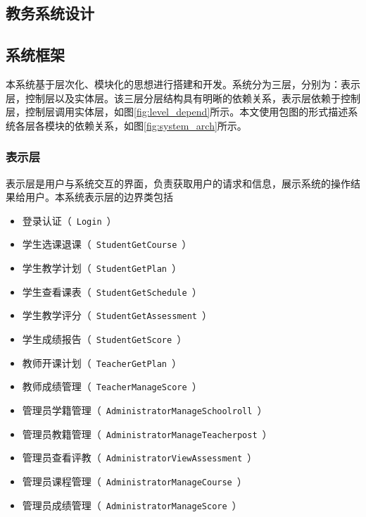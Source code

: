 \begin{center}
  \section{教务系统设计}
\end{center}

\subsection{系统框架}\label{sec:system_frame}
本系统基于层次化、模块化的思想进行搭建和开发。系统分为三层，分别为：表示层，控制层以及实体层。该三层分层结构具有明晰的依赖关系，表示层依赖于控制层，控制层调用实体层，如图\ref{fig:level_depend}所示。本文使用包图的形式描述系统各层各模块的依赖关系，如图\ref{fig:system_arch}所示。

\subsubsection{表示层}
  
表示层是用户与系统交互的界面，负责获取用户的请求和信息，展示系统的操作结果给用户。本系统表示层的边界类包括

\begin{itemize}
  \item 登录认证（~\texttt{Login}~）
  \item 学生选课退课（~\texttt{StudentGetCourse}~）
  \item 学生教学计划（~\texttt{StudentGetPlan}~）
  \item 学生查看课表（~\texttt{StudentGetSchedule}~）
  \item 学生教学评分（~\texttt{StudentGetAssessment}~）
  \item 学生成绩报告（~\texttt{StudentGetScore}~）
  \item 教师开课计划（~\texttt{TeacherGetPlan}~）
  \item 教师成绩管理（~\texttt{TeacherManageScore}~）
  \item 管理员学籍管理（~\texttt{AdministratorManageSchoolroll}~）
  \item 管理员教籍管理（~\texttt{AdministratorManageTeacherpost}~）
  \item 管理员查看评教（~\texttt{AdministratorViewAssessment}~）
  \item 管理员课程管理（~\texttt{AdministratorManageCourse}~）
  \item 管理员成绩管理（~\texttt{AdministratorManageScore}~）
\end{itemize}
  
